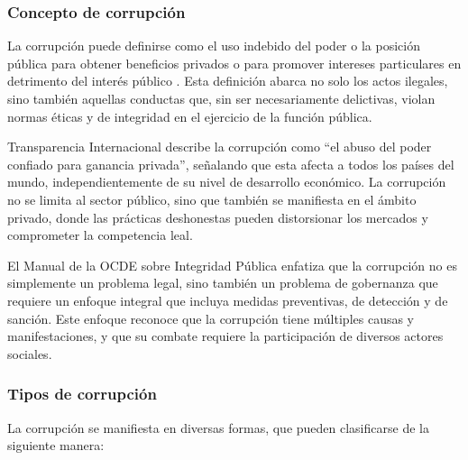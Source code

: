 \documentclass[12pt,a4paper]{article}
\begin{document}
\subsubsection{Concepto de corrupción}

La corrupción puede definirse como el uso indebido del poder o la posición pública para obtener beneficios privados o para promover intereses particulares en detrimento del interés público \parencite{transparencia2023}. Esta definición abarca no solo los actos ilegales, sino también aquellas conductas que, sin ser necesariamente delictivas, violan normas éticas y de integridad en el ejercicio de la función pública.

Transparencia Internacional \parencite{transparencia2023} describe la corrupción como ``el abuso del poder confiado para ganancia privada'', señalando que esta afecta a todos los países del mundo, independientemente de su nivel de desarrollo económico. La corrupción no se limita al sector público, sino que también se manifiesta en el ámbito privado, donde las prácticas deshonestas pueden distorsionar los mercados y comprometer la competencia leal.

El Manual de la OCDE sobre Integridad Pública \parencite{ocde2020} enfatiza que la corrupción no es simplemente un problema legal, sino también un problema de gobernanza que requiere un enfoque integral que incluya medidas preventivas, de detección y de sanción. Este enfoque reconoce que la corrupción tiene múltiples causas y manifestaciones, y que su combate requiere la participación de diversos actores sociales.

\subsubsection{Tipos de corrupción}

La corrupción se manifiesta en diversas formas, que pueden clasificarse de la siguiente manera:
\end{document}
